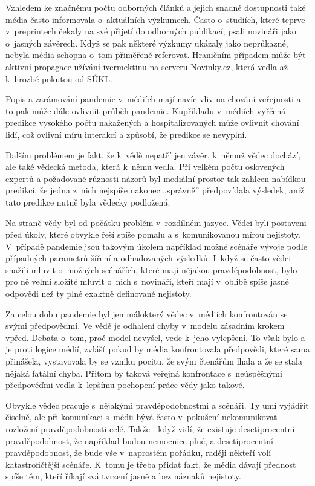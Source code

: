 Vzhledem ke značnému počtu odborných článků a jejich snadné dostupnosti také média často informovala o~aktuálních výzkumech. Často o~studiích, které teprve v~preprintech čekaly na své přijetí do odborných publikací, psali novináři jako o~jasných závěrech. Když se pak některé výzkumy ukázaly jako neprůkazné, nebyla média schopna o~tom přiměřeně referovat. Hraničním případem může být aktivní propagace užívání ivermektinu na serveru Novinky.cz, která vedla až k~hrozbě pokutou od SÚKL.

Popis a zarámování pandemie v~médiích mají navíc vliv na chování veřejnosti a to pak může dále ovlivnit průběh pandemie. Kupříkladu v~médiích vyřčená predikce vysokého počtu nakažených a hospitalizovaných může ovlivnit chování lidí, což ovlivní míru interakcí a způsobí, že predikce se nevyplní.

Dalším problémem je fakt, že k~vědě nepatří jen závěr, k~němuž vědec dochází, ale také vědecká metoda, která k~němu vedla. Při velkém počtu oslovených expertů a požadované  různosti názorů byl mediální prostor tak zahlcen nabídkou predikcí, že jedna z~nich nejspíše nakonec „správně” předpovídala výsledek, aniž tato predikce nutně byla vědecky podložená.

Na straně vědy byl od počátku problém v~rozdílném jazyce. Vědci byli postaveni před úkoly, které obvykle řeší spíše pomalu a s~komunikovanou mírou nejistoty. V~případě pandemie jsou takovým úkolem například možné scénáře vývoje podle případných parametrů šíření a odhadovaných výsledků. I~když se často vědci snažili mluvit o~možných scénářích, které mají nějakou pravděpodobnost, bylo pro ně velmi složité mluvit o~nich s~novináři, kteří mají v~oblibě spíše jasné odpovědi než ty plné exaktně definované nejistoty.

Za celou dobu pandemie byl jen málokterý vědec v~médiích konfrontován se svými předpověďmi. Ve vědě je odhalení chyby v~modelu zásadním krokem vpřed. Debata o~tom, proč model nevyšel, vede k~jeho vylepšení. To však bylo a je proti logice médií, zvlášť pokud by média konfrontovala předpovědi, které sama přinášela, vystavovala by se vzniku pocitu, že svým čtenářům lhala a že se stala nějaká fatální chyba. Přitom by taková veřejná konfrontace s~neúspěšnými předpověďmi vedla k~lepšímu pochopení práce vědy jako takové.

Obvykle vědec pracuje s~nějakými pravděpodobnostmi a scénáři. Ty umí vyjádřit číselně, ale při komunikaci s~médii bývá často v~pokušení nekomunikovat rozložení pravděpodobnosti celé. Takže i když vidí, že existuje desetiprocentní pravděpodobnost, že například budou nemocnice plné, a desetiprocentní pravděpodobnost, že bude vše v~naprostém pořádku, raději někteří volí katastrofičtější scénáře. K~tomu je třeba přidat fakt, že média dávají přednost spíše těm, kteří říkají svá tvrzení jasně a bez náznaků nejistoty.

